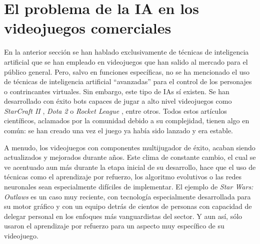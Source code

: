 
\section{El problema de la IA en los videojuegos comerciales} \label{sec:problema_ia_videojuegos}

En la anterior sección se han hablado exclusivamente de técnicas de inteligencia artificial que se han empleado en videojuegos que han salido al mercado para el público general. Pero, salvo en funciones específicas, no se ha mencionado el uso de técnicas de inteligencia artificial ``avanzadas'' para el control de los personajes o contrincantes virtuales. Sin embargo, este tipo de IAs sí existen. Se han desarrollado con éxito bots capaces de jugar a alto nivel videojuegos como \textit{StarCraft II} \cite{vinyals_grandmaster_2019}, \textit{Dota 2} \cite{openai_dota_2019} o \textit{Rocket League} \cite{moschopoulos_lucy-skg_2023}, entre otros. Todos estos artículos científicos, aclamados por la comunidad debido a su complejidad, tienen algo en común: se han creado una vez el juego ya había sido lanzado y era estable.

A menudo, los videojuegos con componentes multijugador de éxito, acaban siendo actualizados y mejorados durante años. Este clima de constante cambio, el cual se ve acentuado aun más durante la etapa inicial de su desarrollo, hace que el uso de técnicas como el aprendizaje por refuerzo, los algoritmo evolutivos o las redes neuronales sean especialmente difíciles de implementar. El ejemplo de \textit{Star Wars: Outlaws} es un caso muy reciente, con tecnología especialmente desarrollada para su motor gráfico y con un equipo detrás de cientos de personas con capacidad de delegar personal en los enfoques más vanguardistas del sector. Y aun así, sólo usaron el aprendizaje por refuerzo para un aspecto muy específico de su videojuego.

